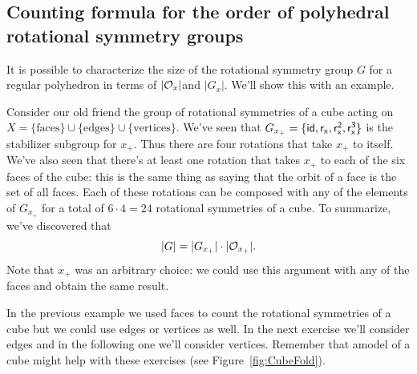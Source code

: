 
\subsection{Counting formula for the order of  polyhedral rotational symmetry groups}

It is possible to characterize the size of the rotational symmetry group $G$ for a regular polyhedron in terms of $|{\cal O}_x|$and $|G_x|$. We'll show this with an example.

\begin{example}\label{example:actions:CountingFormula1} 
Consider our old friend the group of rotational symmetries of a cube acting on $X=\{\text{faces}\}\cup\{\text{edges}\}\cup\{\text{vertices}\}$. We've seen that $G_{x_+}=\{\sf{id},r_x,r_x^2,r_x^3\}$ is the stabilizer subgroup for $x_+$.  Thus there are four rotations that take $x_+$ to itself.  We've also seen that there's at least one rotation that takes $x_+$ to each of the six faces of the cube:  this is the same thing as saying that the orbit of a face is the set of all faces.  Each of these rotations can be composed with any of the elements of $G_{x_+}$ for a total of $6\cdot 4=24$ rotational symmetries of a cube.  To summarize, we've discovered that 
$$|G|=|G_{x_+}|\cdot |{\cal O}_{x_+}|.$$
Note that $x_+$ was an arbitrary choice: we could use this argument with any of the faces and obtain the same result.
\end{example}

In the previous example we used faces to count the rotational symmetries of a cube but we could use edges or vertices as well.  In the next exercise we'll consider edges and in the following one we'll consider vertices.   Remember that amodel of a cube might help with these exercises (see Figure~\ref{fig:CubeFold}).

